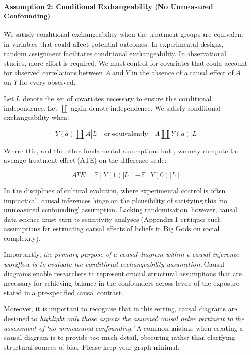 \documentclass[
  singlecolumn,
  9pt]{article}
\let\oldparagraph\paragraph
\renewcommand{\paragraph}[1]{\oldparagraph{#1}\mbox{}}
\begin{document}
\paragraph{Assumption 2: Conditional Exchangeability (No Unmeasured
Confounding)}\label{assumption-2-conditional-exchangeability-no-unmeasured-confounding}

We satisfy conditional exchangeability when the treatment groups are
equivalent in variables that could affect potential outcomes. In
experimental designs, random assignment facilitates conditional
exchangeability. In observational studies, more effort is required. We
must control for covariates that could account for observed correlations
between \(A\) and \(Y\) in the absence of a causal effect of \(A\) on
\(Y\) for every observed.

Let \(L\) denote the set of covariates necessary to ensure this
conditional independence. Let \(\coprod\) again denote independence. We
satisfy conditional exchangeability when:

\[
Y(a) \coprod A | L \quad \text{or equivalently} \quad A \coprod Y(a) | L
\]

Where this, and the other fundamental assumptions hold, we may compute
the average treatment effect (ATE) on the difference scale:

\[
ATE = \mathbb{E}[Y(1) | L] - \mathbb{E}[Y(0) | L]
\]

In the disciplines of cultural evolution, where experimental control is
often impractical, causal inferences hinge on the plausibility of
satisfying this `no unmeasured confounding' assumption. Lacking
randomisation, however, causal data science must turn to sensitivity
analyses (Appendix 1 critiques such assumptions for estimating causal
effects of beliefs in Big Gods on social complexity).

Importantly, \emph{the primary purpose of a causal diagram within a
causal inference workflow is to evaluate the conditional exchangeability
assumption.} Causal diagrams enable researchers to represent crucial
structural assumptions that are necessary for achieving balance in the
confounders across levels of the exposure stated in a pre-specified
causal contrast.

Moreover, it is important to recognise that in this setting, causal
diagrams are designed to \emph{highlight only those aspects the assumed
causal order pertinent to the assessment of `no-unmeasured
confounding.'} A common mistake when creating a causal diagram is to
provide too much detail, obscuring rather than clarifying structural
sources of bias. Please keep your graph minimal.
\end{document}
